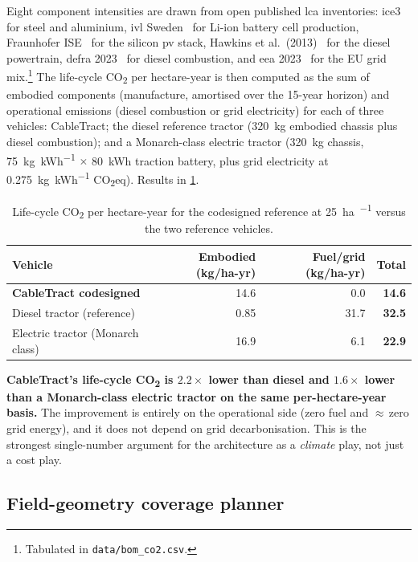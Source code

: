 \documentclass[11pt,a4paper]{article}
\begin{document}
Eight component intensities are drawn from open published \gls{lca} inventories: \gls{ice3}~\cite{hammond2019ice} for steel and aluminium, \gls{ivl} Sweden~\cite{emilsson2019battery} for Li-ion battery cell production, Fraunhofer ISE~\cite{fraunhoferise2022pv} for the silicon \gls{pv} stack, Hawkins et al.\ (2013)~\cite{hawkins2013ev} for the diesel powertrain, \gls{defra} 2023~\cite{defra2023factors} for diesel combustion, and \gls{eea} 2023~\cite{eea2023electricity} for the EU grid mix.\footnote{Tabulated in \texttt{data/bom\_co2.csv}.} The life-cycle CO\textsubscript{2} per hectare-year is then computed as the sum of embodied components (manufacture, amortised over the 15-year horizon) and operational emissions (diesel combustion or grid electricity) for each of three vehicles: CableTract; the diesel reference tractor (\SI{320}{\kilogram} embodied chassis plus diesel combustion); and a Monarch-class electric tractor (\SI{320}{\kilogram} chassis, \SI{75}{\kilogram\per\kWh} $\times$ \SI{80}{\kWh} traction battery, plus grid electricity at \SI{0.275}{\kilogram\per\kWh} CO\textsubscript{2}eq). Results in \cref{tab:lca}.

\begin{table}[H]
\centering\small
\caption{Life-cycle CO\textsubscript{2} per hectare-year for the codesigned reference at \SI{25}{\hectare\per\year} versus the two reference vehicles.}\label{tab:lca}
\begin{tabular}{lrrr}
\toprule
Vehicle & Embodied (kg/ha-yr) & Fuel/grid (kg/ha-yr) & \textbf{Total} \\
\midrule
\textbf{CableTract codesigned}    & 14.6 & 0.0  & \textbf{14.6} \\
Diesel tractor (reference)        & 0.85 & 31.7 & \textbf{32.5} \\
Electric tractor (Monarch class)  & 16.9 & 6.1  & \textbf{22.9} \\
\bottomrule
\end{tabular}
\end{table}

\textbf{CableTract's life-cycle CO\textsubscript{2} is $2.2\times$ lower than diesel and $1.6\times$ lower than a Monarch-class electric tractor on the same per-hectare-year basis.} The improvement is entirely on the operational side (zero fuel and ${\approx}$\,zero grid energy), and it does not depend on grid decarbonisation. This is the strongest single-number argument for the architecture as a \emph{climate} play, not just a cost play.

\subsection{Field-geometry coverage planner}\label{sec:layout}
\end{document}
